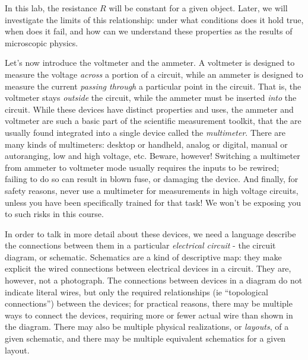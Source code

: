 \documentclass[12pt]{article}
\begin{document}
In this lab, the resistance $R$ will be constant for a given object.
Later, we will investigate the limits of this relationship: under what
conditions does it hold true, when does it fail, and how can we
understand these properties as the results of microscopic physics.

Let's now introduce the voltmeter and the ammeter.  A voltmeter is
designed to measure the voltage \textit{across} a portion of a
circuit, while an ammeter is designed to measure the current
\textit{passing through} a particular point in the circuit.  That is,
the voltmeter stays \textit{outside} the circuit, while the ammeter
must be inserted \textit{into} the circuit.  While these devices have
distinct properties and uses, the ammeter and voltmeter are such a
basic part of the scientific measurement toolkit, that the are usually
found integrated into a single device called the \textit{multimeter}.
There are many kinds of multimeters: desktop or handheld, analog or
digital, manual or autoranging, low and high voltage, etc.  Beware,
however!  Switching a multimeter from ammeter to voltmeter mode
usually requires the inputs to be rewired; failing to do so can result
in blown fuse, or damaging the device.  And finally, for safety
reasons, never use a multimeter for measurements in high voltage
circuits, unless you have been specifically trained for that task!  We
won't be exposing you to such risks in this course.

In order to talk in more detail about these devices, we need a
language describe the connections between them in a particular
\textit{electrical circuit} - the circuit diagram, or schematic.
Schematics are a kind of descriptive map: they make explicit the wired
connections between electrical devices in a circuit.  They are,
however, not a photograph.  The connections between devices in a
diagram do not indicate literal wires, but only the required
relationships (ie ``topological connections'') between the devices;
for practical reasons, there may be multiple ways to connect the
devices, requiring more or fewer actual wire than shown in the
diagram.  There may also be multiple physical realizations, or
\textit{layouts}, of a given schematic, and there may be multiple
equivalent schematics for a given layout.
\end{document}
